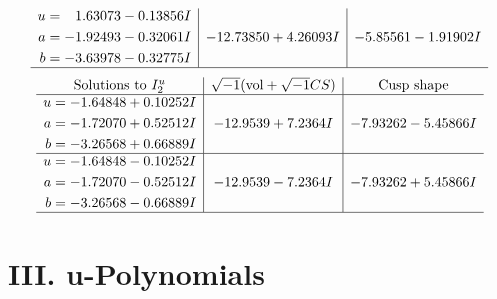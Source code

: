 \documentclass[1p]{elsarticle_modified}
\theoremstyle{definition}
\newcommand{\I}{\sqrt{-1}}
\begin{document}
$$\begin{array}{c|c|c}
\begin{aligned}
u &= \phantom{-}1.63073 - 0.13856 I \\
a &= -1.92493 - 0.32061 I \\
b &= -3.63978 - 0.32775 I\end{aligned}
 & -12.73850 + 4.26093 I & -5.85561 - 1.91902 I\\
 \hline 
 \end{array}$$\newpage$$\begin{array}{c|c|c}  
\text{Solutions to }I^u_{2}& \I (\text{vol} + \sqrt{-1}CS) & \text{Cusp shape}\\
 \hline 
\begin{aligned}
u &= -1.64848 + 0.10252 I \\
a &= -1.72070 + 0.52512 I \\
b &= -3.26568 + 0.66889 I\end{aligned}
 & -12.9539 + 7.2364 I & -7.93262 - 5.45866 I \\ \hline\begin{aligned}
u &= -1.64848 - 0.10252 I \\
a &= -1.72070 - 0.52512 I \\
b &= -3.26568 - 0.66889 I\end{aligned}
 & -12.9539 - 7.2364 I & -7.93262 + 5.45866 I\\
 \hline 
 \end{array}$$\newpage
\newpage\renewcommand{\arraystretch}{1}
\centering \section*{ III. u-Polynomials}
\end{document}
